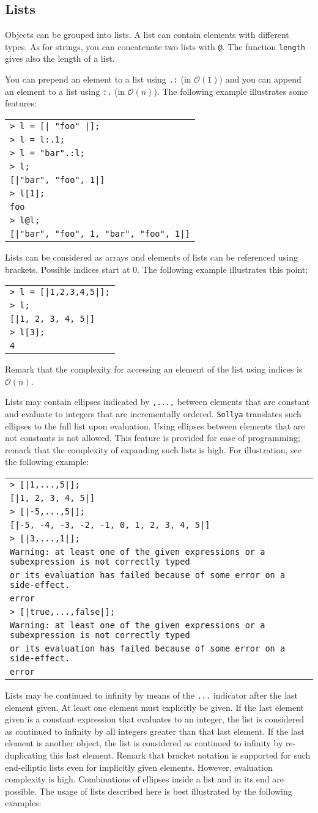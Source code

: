 \documentclass[a4paper]{article}
\newcommand{\com}[1]{\texttt{#1}}
\newcommand{\sollya}{\texttt{Sollya}\xspace}
\newcommand{\code}[1]{
\begin{center}
\begin{tabular}{|p{14.8cm}|}
\hline
#1
\hline
\end{tabular}
\end{center}
}
\newcommand{\ligne}[1]{\texttt{#1}\\}
\begin{document}
\subsection{Lists}
Objects can be grouped into lists. A list can contain elements with different types. As for strings, you can concatenate two lists with \com{@}. The function \com{length} gives also the length of a list.

You can prepend an element to a list using \com{.:} (in $\mathcal{O}(1)$) and you can append an element to a list using \com{:.} (in $\mathcal{O}(n)$). The following example illustrates some features:

\code{
\ligne{> l = [| "foo" |];}
\ligne{> l = l:.1;}
\ligne{> l = "bar".:l;}
\ligne{> l;}
\ligne{[|"bar", "foo", 1|]}
\ligne{> l[1];}
\ligne{foo}
\ligne{> l@l;}
\ligne{[|"bar", "foo", 1, "bar", "foo", 1|]}
}

Lists can be considered as arrays and elements of lists can be
referenced using brackets. Possible indices start at $0$. The
following example illustrates this point:

\code{
\ligne{> l = [|1,2,3,4,5|];}
\ligne{> l;}
\ligne{[|1, 2, 3, 4, 5|]}
\ligne{> l[3];}
\ligne{4}
}

Remark that the complexity for accessing an element of the list using
indices is $\mathcal{O}(n)$.

Lists may contain ellipses indicated by \texttt{,...,} between
elements that are constant and evaluate to integers that are
incrementally ordered. \sollya translates such ellipses to the full
list upon evaluation. Using ellipses between elements that are not
constants is not allowed. This feature is provided for ease of
programming; remark that the complexity of expanding such lists is
high. For illustration, see the following example:

\code{
\ligne{> [|1,...,5|];}
\ligne{[|1, 2, 3, 4, 5|]}
\ligne{> [|-5,...,5|];}
\ligne{[|-5, -4, -3, -2, -1, 0, 1, 2, 3, 4, 5|]}
\ligne{> [|3,...,1|];}
\ligne{Warning: at least one of the given expressions or a subexpression is not correctly typed}
\ligne{or its evaluation has failed because of some error on a side-effect.}
\ligne{error}
\ligne{> [|true,...,false|];}
\ligne{Warning: at least one of the given expressions or a subexpression is not correctly typed}
\ligne{or its evaluation has failed because of some error on a side-effect.}
\ligne{error}
}

Lists may be continued to infinity by means of the \texttt{...}
indicator after the last element given. At least one element must
explicitly be given. If the last element given is a constant
expression that evaluates to an integer, the list is considered as
continued to infinity by all integers greater than that last
element. If the last element is another object, the list is considered
as continued to infinity by re-duplicating this last element. Remark
that bracket notation is supported for such end-elliptic lists even
for implicitly given elements. However, evaluation complexity is
high. Combinations of ellipses inside a list and in its end are
possible. The usage of lists described here is best illustrated by the
following examples:
\end{document}
